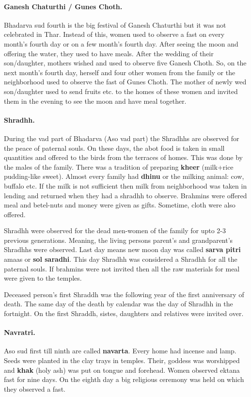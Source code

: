 \paragraph{Ganesh Chaturthi / Gunes Choth.} Bhadarva sud fourth is the big
festival of Ganesh Chaturthi but it was not celebrated in Thar. Instead of
this, women used to observe a fast on every month's fourth day or on a few
month's fourth day.  After seeing the moon and offering the water, they used to
have meals. After the wedding of their son/daughter, mothers wished and used to
observe five Ganesh Choth. So, on the next month's fourth day, herself and four
other women from the family or the neighborhood used to observe the fast of
Gunes Choth.  The mother of newly wed son/daughter used to send fruits etc. to
the homes of these women and invited them in the evening to see the moon and
have meal together.  \paragraph{Shradhh.} During the vad part of Bhadarva (Aso
vad part) the Shradhhs are observed for the peace of paternal souls. On these
days, the abot food is taken in small quantities and offered to the birds from
the terraces of homes.  This was done by the males of the family. There was a
tradition of preparing \textbf{kheer} (milk+rice pudding-like sweet). Almost
every family had \textbf{dhinu} or the milking animal: cow, buffalo etc. If the
milk is not sufficient then milk from neighborhood was taken in lending and
returned when they had a shradhh to observe. Brahmins were offered meal and
betel-nuts and money were given as gifts. Sometime, cloth were also offered.

Shradhh were observed for the dead men-women of the family for upto 2-3
previous generations. Meaning, the living persons parent's and grandparent's
Shradhhs were observed. Last day means new moon day was called \textbf{sarva
pitri} amaas or \textbf{sol saradhi}. This day Shradhh was considered a Shradhh
for all the paternal souls. If brahmins were not invited then all the raw
materials for meal were given to the temples.

Deceased person's first Shraddh was the following year of the first anniversary
of death. The same day of the death by calendar was the day of Shradhh in the
fortnight. On the first Shraddh, sistes, daughters and relatives were invited
over. 
\paragraph{Navratri.} Aso sud first till ninth are called \textbf{navarta}.
Every home had incense and lamp. Seeds were planted in the clay trays in
temples. Their, goddess was worshipped and \textbf{khak} (holy ash) was put on
tongue and forehead. Women observed ektana fast for nine days. On the eighth day
a big religious ceremony was held on which they observed a fast.
